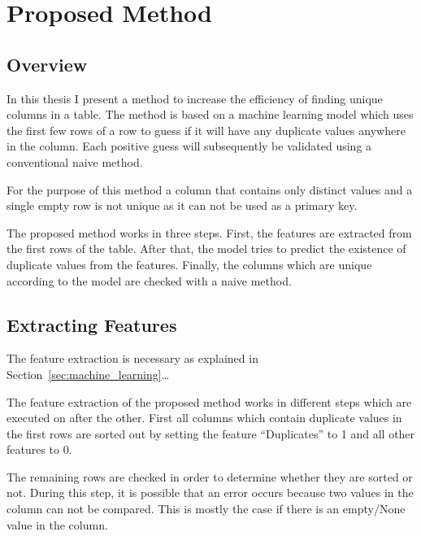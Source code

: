 \chapter{Proposed Method}\label{chap:proposed_method}
\section{Overview}\label{sec:overview}
In this thesis I present a method to increase the efficiency of finding unique columns in a table. The method is based on a machine learning model which uses the first few rows of a row to guess if it will have any duplicate values anywhere in the column. Each positive guess will subsequently be validated using a conventional naive method. %

For the purpose of this method a column that contains only distinct values and a single empty row is not unique as it can not be used as a primary key. %

The proposed method works in three steps. First, the features are extracted from the first rows of the table. After that, the model tries to predict the existence of duplicate values from the features. Finally, the columns which are unique according to the model are checked with a naive method.



\section{Extracting Features}\label{sec:extracted_features} %
The feature extraction is necessary as explained in Section~\ref{sec:machine_learning}\ldots %

The feature extraction of the proposed method works in different steps which are executed on after the other. First all columns which contain duplicate values in the first rows are sorted out by setting the feature \enquote{Duplicates} to \num{1} and all other features to \num{0}.

The remaining rows are checked in order to determine whether they are sorted or not. During this step, it is possible that an error occurs because two values in the column can not be compared. This is mostly the case if there is an empty/None value in the column.

